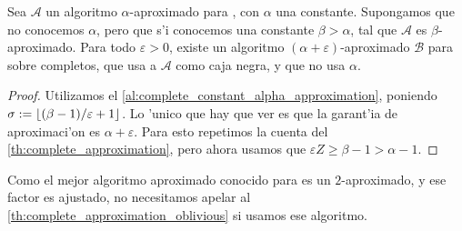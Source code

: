 \begin{theorem}
\label{th:complete_approximation_oblivious}
Sea $\mathcal{A}$ un algoritmo $\alpha$-aproximado para , con $\alpha$ una constante. Supongamos que no conocemos $\alpha$, pero que s'i conocemos una constante $\beta > \alpha$, tal que $\mathcal{A}$ es $\beta$-aproximado. Para todo $\varepsilon > 0$, existe un algoritmo $(\alpha + \varepsilon)$-aproximado $\mathcal{B}$ para  sobre completos, que usa a $\mathcal{A}$ como caja negra, y que no usa $\alpha$.

\begin{proof}
Utilizamos el \autoref{al:complete_constant_alpha_approximation}, poniendo $\sigma := \left\lfloor (\beta - 1) / \varepsilon + 1 \right\rfloor$. Lo 'unico que hay que ver es que la garant'ia de aproximaci'on es $\alpha + \varepsilon$. Para esto repetimos la cuenta del \autoref{th:complete_approximation}, pero ahora usamos que $\varepsilon Z \geq \beta - 1 > \alpha - 1$.
\end{proof}
\end{theorem}

Como el mejor algoritmo aproximado conocido para  es un $2$-aproximado, y ese factor es ajustado, no necesitamos apelar al \autoref{th:complete_approximation_oblivious} si usamos ese algoritmo.

